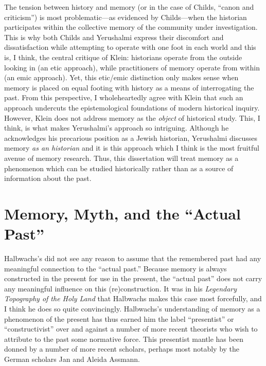 The tension between history and memory (or in the case of Childs,
``canon and criticism'') is most problematic---as evidenced by
Childs---when the historian participates within the collective memory of
the community under investigation. This is why both Childs and
Yerushalmi express their discomfort and dissatisfaction while attempting
to operate with one foot in each world and this is, I think, the central
critique of Klein: historians operate from the outside looking in (an
etic approach), while practitioners of memory operate from within (an
emic approach). Yet, this etic/emic distinction only makes sense when
memory is placed on equal footing with history as a means of
interrogating the past. From this perspective, I wholeheartedly agree
with Klein that such an approach undercuts the epistemological
foundations of modern historical inquiry. However, Klein does not
address memory as the \emph{object} of historical study. This, I think,
is what makes Yerushalmi's approach so intriguing. Although he
acknowledges his precarious position as a Jewish historian, Yerushalmi
discusses memory \emph{as an historian} and it is this approach which I
think is the most fruitful avenue of memory research. Thus, this
dissertation will treat memory as a phenomenon which can be studied
historically rather than as a source of information about the past.

\hypertarget{memory-myth-and-the-actual-past}{%
\section{Memory, Myth, and the ``Actual
Past''}\label{memory-myth-and-the-actual-past}}

Halbwachs's did not see any reason to assume that the remembered past
had any meaningful connection to the ``actual past.'' Because memory is
always constructed in the present for use in the present, the ``actual
past'' does not carry any meaningful influence on this (re)construction.
It was in his \emph{Legendary Topography of the Holy Land} that
Halbwachs makes this case most forcefully, and I think he does so quite
convincingly. Halbwachs's understanding of memory as a phenomenon of the
present has thus earned him the label ``presentist'' or
``constructivist'' over and against a number of more recent theorists
who wish to attribute to the past some normative
force.\autocite[27--30]{coser_halbwachs1992} This presentist mantle has
been donned by a number of more recent scholars, perhaps most notably by
the German scholars Jan and Aleida Assmann.\autocites[See
esp.][]{assmann_nikulin2015}{assmann2011}[and][]{a_assmann2011}

